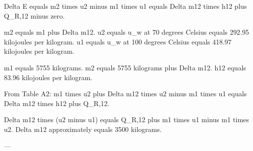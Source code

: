 Delta E equals m2 times u2 minus m1 times u1 equals Delta m12 times h12 plus Q_R,12 minus zero.  

m2 equals m1 plus Delta m12.  
u2 equals u_w at 70 degrees Celsius equals 292.95 kilojoules per kilogram.  
u1 equals u_w at 100 degrees Celsius equals 418.97 kilojoules per kilogram.  

m1 equals 5755 kilograms.  
m2 equals 5755 kilograms plus Delta m12.  
h12 equals 83.96 kilojoules per kilogram.  

From Table A2:  
m1 times u2 plus Delta m12 times u2 minus m1 times u1 equals Delta m12 times h12 plus Q_R,12.  

Delta m12 times (u2 minus u1) equals Q_R,12 plus m1 times u1 minus m1 times u2.  
Delta m12 approximately equals 3500 kilograms.  

---